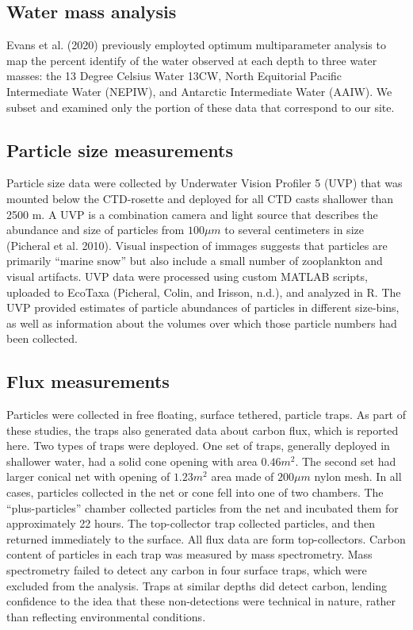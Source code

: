 \documentclass[]{article}
\begin{document}
\hypertarget{water-mass-analysis}{%
\subsection{Water mass analysis}\label{water-mass-analysis}}

Evans et al. (2020) previously employted optimum multiparameter analysis
to map the percent identify of the water observed at each depth to three
water masses: the 13 Degree Celsius Water 13CW, North Equitorial Pacific
Intermediate Water (NEPIW), and Antarctic Intermediate Water (AAIW). We
subset and examined only the portion of these data that correspond to
our site.

\hypertarget{particle-size-measurements}{%
\subsection{Particle size
measurements}\label{particle-size-measurements}}

Particle size data were collected by Underwater Vision Profiler 5 (UVP)
that was mounted below the CTD-rosette and deployed for all CTD casts
shallower than 2500 m. A UVP is a combination camera and light source
that describes the abundance and size of particles from \(100 \mu m\) to
several centimeters in size (Picheral et al. 2010). Visual inspection of
immages suggests that particles are primarily ``marine snow'' but also
include a small number of zooplankton and visual artifacts. UVP data
were processed using custom MATLAB scripts, uploaded to EcoTaxa
(Picheral, Colin, and Irisson, n.d.), and analyzed in R. The UVP
provided estimates of particle abundances of particles in different
size-bins, as well as information about the volumes over which those
particle numbers had been collected.

\hypertarget{flux-measurements}{%
\subsection{Flux measurements}\label{flux-measurements}}

Particles were collected in free floating, surface tethered, particle
traps. As part of these studies, the traps also generated data about
carbon flux, which is reported here. Two types of traps were deployed.
One set of traps, generally deployed in shallower water, had a solid
cone opening with area \(0.46m^2\). The second set had larger conical
net with opening of \(1.23m^2\) area made of \(200\mu m\) nylon mesh. In
all cases, particles collected in the net or cone fell into one of two
chambers. The ``plus-particles'' chamber collected particles from the
net and incubated them for approximately 22 hours. The top-collector
trap collected particles, and then returned immediately to the surface.
All flux data are form top-collectors. Carbon content of particles in
each trap was measured by mass spectrometry. Mass spectrometry failed to
detect any carbon in four surface traps, which were excluded from the
analysis. Traps at similar depths did detect carbon, lending confidence
to the idea that these non-detections were technical in nature, rather
than reflecting environmental conditions.
\end{document}
